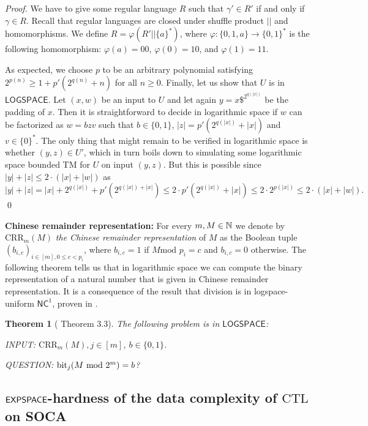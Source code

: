 \documentclass[times,envcountsame]{llncs}
\newtheorem{theorem}{{\bf Theorem}}[section]
\renewcommand{\mod}{\text{mod }}
\newcommand{\modulo}{\mod}
\def\CRR{{\mathrm{CRR}}}
\renewcommand{\L}{\mathsf{LOGSPACE}}
\newcommand{\ctl}{\text{CTL}}
\begin{document}
\begin{proof}
We have to give some regular language $R$ such that $\gamma'\in R'$ if and only
if $\gamma\in R$.
Recall that regular languages are closed under shuffle product $|\!|$ and
homomorphisms.
We define $R=\varphi(R'|\!|\{a\}^*)$, where
$\varphi:\{0,1,a\}\rightarrow\{0,1\}^*$ is the following homomorphism:
$\varphi(a)=00$, $\varphi(0)=10$, and $\varphi(1)=11$.

As expected, we choose $p$ to be an arbitrary polynomial satisfying
$2^{p(n)}\geq 1+p'(2^{q(n)}+n)$ for all $n\geq0$.
Finally, let us show that $U$ is in $\L$.
Let $(x,w)$ be an input to $U$ and let again $y=x\$^{2^{q(|x|)}}$ be the padding
of $x$.
Then it is straightforward to decide in logarithmic space if $w$ can be factorized as
$w=bzv$ such that $b\in\{0,1\}$, $|z|=p'(2^{q(|x|)}+|x|)$ and
$v\in\{0\}^*$.
The only thing that might remain to be verified in logarithmic space is whether
$(y,z)\in U'$, which in turn boils down to simulating some logarithmic space bounded TM
for $U$ on input $(y,z)$.
But this is possible since $|y|+|z|\leq 2\cdot(|x|+|w|)$ as
$$
|y|+|z|=|x|+2^{q(|x|)}+p'(2^{q(|x|)+|x|})\leq 2\cdot p'(2^{q(|x|)}+|x|)\leq
2\cdot 2^{p(|x|)}\leq 2\cdot (|x|+|w|).
$$
\qed
\end{proof}

\renewcommand{\M}{\mathcal{M}}

\noindent
\textbf{Chinese remainder representation: }
 For every $m,M\in\mathbb{N}$ we denote by $\CRR_m(M)$ {\em the Chinese remainder
representation} of $M$ as the Boolean tuple
$(b_{i,c})_{i\in[m],0\leq c<p_i}$, where $b_{i,c}=1$ if $M\modulo p_i=c$
and $b_{i,c}=0$ otherwise.
The following theorem tells us that in logarithmic space we can
compute the binary representation of a natural number that is given in Chinese
remainder representation.
It is a consequence of the result that division is in logspace-uniform
$\mathsf{NC}^1$, proven in \cite{ChDaLi01}.


\begin{theorem}[\cite{ChDaLi01} Theorem 3.3]{\label{T CRRBIN}}
The following problem is in $\L$:

INPUT: $\CRR_m(M),j\in[m]$, $b\in\{0,1\}$.

QUESTION: $\bit_j(M\ \modulo 2^m)=b$?
\end{theorem}


\subsection{${\mathsf{EXPSPACE}}$-hardness of the data complexity of $\ctl$ on SOCA}{\label{S CTL hardness}}
\end{document}

